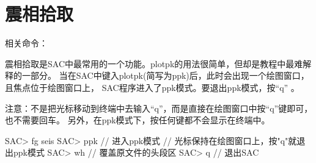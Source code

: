 \section{震相拾取}
\label{sec:phase-picking}

相关命令：

震相拾取是SAC中最常用的一个功能。plotpk的用法很简单，但却是教程中最难解释的一部分。
当在SAC中键入plotpk(简写为ppk)后，此时会出现一个绘图窗口，且焦点位于绘图窗口上，
SAC程序进入了ppk模式。要退出ppk模式，按``q'' 。

注意：不是把光标移动到终端中去输入``q''，而是直接在绘图窗口中按``q''键即可，也不需要回车。
另外，在ppk模式下，按任何键都不会显示在终端中。

\begin{SACCode}
SAC> fg seis
SAC> ppk        // 进入ppk模式
// 光标保持在绘图窗口上，按"q"就退出ppk模式
SAC> wh         // 覆盖原文件的头段区
SAC> q          // 退出SAC
\end{SACCode}

